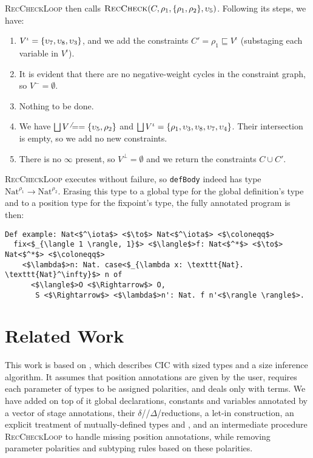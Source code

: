 \documentclass[nonacm,screen,10pt]{acmart}
\begin{document}
\textsc{RecCheckLoop} then calls $\textsc{RecCheck}(C, \rho_1, \{\rho_1, \rho_2\}, \upsilon_5)$. Following its steps, we have:
\begin{enumerate}
    \item $V^\iota = \{\upsilon_7, \upsilon_8, \upsilon_3\}$, and we add the constraints $C' = \rho_1 \sqsubseteq V^\iota$ (substaging each variable in $V^\iota$).
    \item It is evident that there are no negative-weight cycles in the constraint graph, so $V^- = \emptyset$.
    \item Nothing to be done.
    \item We have $\bigsqcup V^\neq = \{\upsilon_5, \rho_2\}$ and $\bigsqcup V^\iota = \{\rho_1, \upsilon_3, \upsilon_8, \upsilon_7, \upsilon_4\}$. Their intersection is empty, so we add no new constraints.
    \item There is no $\infty$ present, so $V^\bot = \emptyset$ and we return the constraints $C \cup C'$.
\end{enumerate}

\textsc{RecCheckLoop} executes without failure, so \texttt{defBody} indeed has type $\text{Nat}^{\rho_1} \to \text{Nat}^{\rho_2}$. Erasing this type to a global type for the global definition's type and to a position type for the fixpoint's type, the fully annotated program is then:

\begin{verbatim}
Def example: Nat<$^\iota$> <$\to$> Nat<$^\iota$> <$\coloneqq$>
  fix<$_{\langle 1 \rangle, 1}$> <$\langle$>f: Nat<$^*$> <$\to$> Nat<$^*$> <$\coloneqq$>
    <$\lambda$>n: Nat. case<$_{\lambda x: \texttt{Nat}. \texttt{Nat}^\infty}$> n of
      <$\langle$>O <$\Rightarrow$> O,
       S <$\Rightarrow$> <$\lambda$>n': Nat. f n'<$\rangle \rangle$>.
\end{verbatim}

\section{Related Work}\label{sec:related}

This work is based on \CIChat \cite{cic-hat}, which describes CIC with sized types and a size inference algorithm. It assumes that position annotations are given by the user, requires each parameter of \coinductive types to be assigned polarities, and deals only with terms. We have added on top of it global declarations, constants and variables annotated by a vector of stage annotations, their $\delta$\-//$\Delta$\-/reductions, a let-in construction, an explicit treatment of mutually-defined \coinductive types and \cofixpoints, and an intermediate procedure \textsc{RecCheckLoop} to handle missing position annotations, while removing parameter polarities and subtyping rules based on these polarities.
\end{document}
